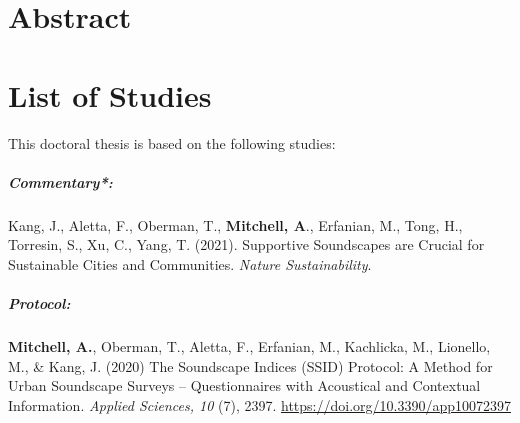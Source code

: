 \documentclass[twoside,fontsize=12pt,titlepage]{scrbook}
\begin{document}
\chapter*{Abstract}




\chapter*{List of Studies}

This doctoral thesis is based on the following studies:

\paragraph*{Commentary*: }
Kang, J., Aletta, F., Oberman, T., \textbf{Mitchell, A}., Erfanian, M., Tong, H., Torresin, S., Xu, C., Yang, T. (2021). Supportive Soundscapes are Crucial for Sustainable Cities and Communities. \emph{Nature Sustainability}.

\paragraph*{Protocol:  }
\textbf{Mitchell, A.}, Oberman, T., Aletta, F., Erfanian, M., Kachlicka, M., Lionello, M., \& Kang, J. (2020) The Soundscape Indices (SSID) Protocol: A Method for Urban Soundscape Surveys -- Questionnaires with Acoustical and Contextual Information. \emph{Applied Sciences, 10} (7), 2397. \url{https://doi.org/10.3390/app10072397}
\end{document}

